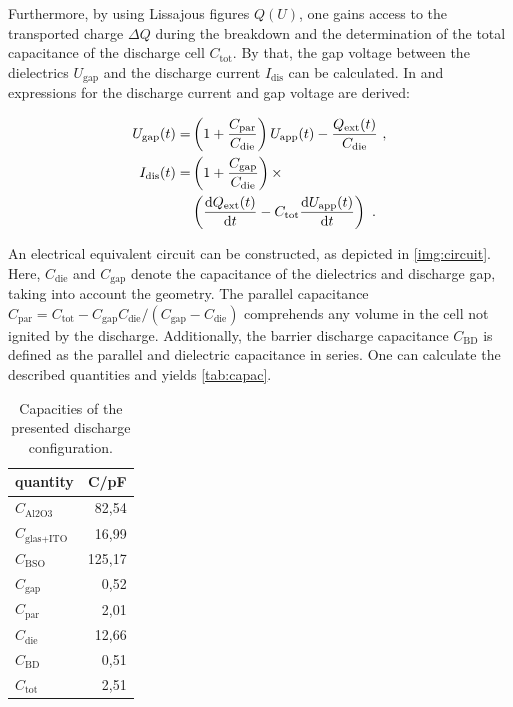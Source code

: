 \documentclass[a4paper,10pt,twoside]{article}
\newcommand{\diff}{\textnormal{d}}
\newcommand{\ix}[1]{_\text{#1}}
\begin{document}
			 Furthermore, by using Lissajous figures $Q(U)$, one gains access to the transported charge $\Delta Q$ during the breakdown and the determination of the total capacitance of the discharge cell $C\ix{tot}$. By that, the gap voltage between the dielectrics $U\ix{gap}$ and the discharge current $I\ix{dis}$ can be calculated. In \cite{Liu2003} and \cite{0022-3727-48-40-405203} expressions for the discharge current and gap voltage are derived:
			 			 
				 \begin{align}
					 U\ix{gap}(t)=&\left(1+\frac{C\ix{par}}{C\ix{die}}\right)U\ix{app}(t)-\frac{Q\ix{ext}(t)}{C\ix{die}} \,\, , \\
					 I\ix{dis}(t)=&\left(1+\frac{C\ix{gap}}{C\ix{die}}\right)\times \nonumber \\
					 &\left(\frac{\diff Q\ix{ext}(t)}{\diff t}-C\ix{tot}\frac{\diff U\ix{app}(t)}{\diff t}\right) \,\, .
				 \end{align}	
				 
			  An electrical equivalent circuit can be constructed, as depicted in \autoref{img:circuit}. Here, $C\ix{die}$ and $C\ix{gap}$ denote the capacitance of the dielectrics and discharge gap, taking into account the geometry. The parallel capacitance $C\ix{par}=C\ix{tot}-C\ix{gap}C\ix{die}/\left(C\ix{gap}-C\ix{die}\right)$ comprehends any volume in the cell not ignited by the discharge. Additionally, the barrier discharge capacitance $C\ix{BD}$ is defined as the parallel and dielectric capacitance in series. One can calculate the described quantities and yields \autoref{tab:capac}.

				\begin{table}[h!]
					\centering
					\begin{tabular}{l|r}
						quantity & C/pF \\ \hline\hline
						$C\ix{Al2O3}$ &  82,54 \\ \hline
						$C\ix{glas+ITO}$ & 16,99 \\ \hline
						$C\ix{BSO}$ & 125,17 \\ \hline
						$C\ix{gap}$ & 0,52 \\ \hline
						$C\ix{par}$ & 2,01 \\ \hline
						$C\ix{die}$ & 12,66 \\ \hline
						$C\ix{BD}$ & 0,51 \\ \hline
						$C\ix{tot}$ & 2,51 \\
					\end{tabular}
					\caption{Capacities of the presented discharge configuration.}\label{tab:capac}
				\end{table}
	
\end{document}
